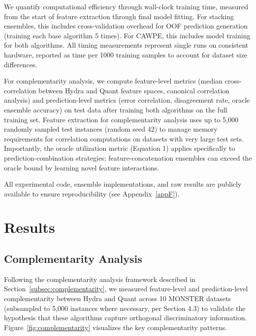 \documentclass[pdflatex,sn-basic]{sn-jnl}           %
\theoremstyle{thmstyleone}%
\theoremstyle{thmstyletwo}%
\theoremstyle{thmstylethree}%
\begin{document}
We quantify computational efficiency through wall-clock training time, measured from the start of feature extraction through final model fitting. For stacking ensembles, this includes cross-validation overhead for OOF prediction generation (training each base algorithm 5 times). For CAWPE, this includes model training for both algorithms. All timing measurements represent single runs on consistent hardware, reported as time per 1000 training samples to account for dataset size differences.

For complementarity analysis, we compute feature-level metrics (median cross-correlation between Hydra and Quant feature spaces, canonical correlation analysis) and prediction-level metrics (error correlation, disagreement rate, oracle ensemble accuracy) on test data after training both algorithms on the full training set. Feature extraction for complementarity analysis uses up to 5,000 randomly sampled test instances (random seed 42) to manage memory requirements for correlation computations on datasets with very large test sets. Importantly, the oracle utilization metric (Equation 1) applies specifically to prediction-combination strategies; feature-concatenation ensembles can exceed the oracle bound by learning novel feature interactions.

All experimental code, ensemble implementations, and raw results are publicly available to ensure reproducibility (see Appendix~\ref{appF}).


\section{Results}\label{sec5}

\subsection{Complementarity Analysis}

Following the complementarity analysis framework described in Section~\ref{subsec:complementarity}, we measured feature-level and prediction-level complementarity between Hydra and Quant across 10 MONSTER datasets (subsampled to 5,000 instances where necessary, per Section 4.3) to validate the hypothesis that these algorithms capture orthogonal discriminatory information. Figure~\ref{fig:complementarity} visualizes the key complementarity patterns.
\end{document}
